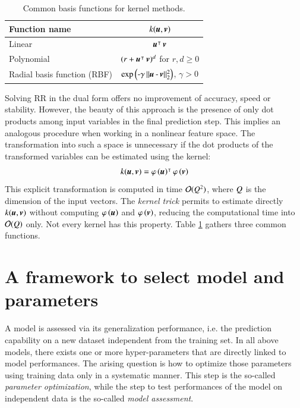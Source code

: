 \begin{table}
\centering
\begin{tabular}{lc} \toprule
	Function name  & $ k (\operatorname{\boldsymbol{u}}, \operatorname{\boldsymbol{v}}) $ \\ \midrule
	Linear  & $ \operatorname{\boldsymbol{u}}^{\intercal} \operatorname{\boldsymbol{v}} $ \\ \midrule
	Polynomial  & $ (r + \operatorname{\boldsymbol{u}}^{\intercal} \operatorname{\boldsymbol{v}})^d $ for $ r,d \geq 0 $\\ \midrule
	Radial basis function (RBF)  & $ \operatorname{\exp{ \left(-\gamma \ensuremath{\operatorname{\Arrowvert \mathit{\operatorname{\boldsymbol{u}} - \operatorname{\boldsymbol{v}}} \Arrowvert^2_2 }}\right)}}$, $ \gamma > 0 $ \\
	\bottomrule
\end{tabular}
\caption{Common basis functions for kernel methods.}
\label{tab_basisfunctions}
\end{table}

Solving RR in the dual form offers no improvement of accuracy, speed or stability. However, the beauty of this approach is the presence of only dot products among input variables in the final prediction step. This implies an analogous procedure when working in a nonlinear feature space. The transformation into such a space is unnecessary if the dot products of the transformed variables can be estimated using the kernel: 
\begin{equation}
k (\operatorname{\boldsymbol{u}}, \operatorname{\boldsymbol{v}}) = \operatorname{ \varphi \left(\mathit{\operatorname{\boldsymbol{u}}}\right)}^{\intercal} \operatorname{ \varphi \left(\mathit{\operatorname{\boldsymbol{v}}}\right)}
\end{equation}
This explicit transformation is computed in time $ \mathcal{O}(Q^2) $, where $ Q $ is the dimension of the input vectors. The \textit{kernel trick} permits to estimate directly $ k (\operatorname{\boldsymbol{u}}, \operatorname{\boldsymbol{v}}) $ without computing $ \operatorname{ \varphi \left(\mathit{\operatorname{\boldsymbol{u}}}\right)} $ and $ \operatorname{ \varphi \left(\mathit{\operatorname{\boldsymbol{v}}}\right)} $, reducing the computational time into $ \mathcal{O}(Q) $ only. Not every kernel has this property. Table \ref{tab_basisfunctions} gathers three common functions.

\section{A framework to select model and parameters}
A model is assessed via its generalization performance, i.e. the prediction capability on a new dataset independent from the training set. In all above models, there exists one or more hyper-parameters that are directly linked to model performances. The arising question is how to optimize those parameters using training data only in a systematic manner. This step is the so-called \textit{parameter optimization}, while the step to test performances of the model on independent data is the so-called \textit{model assessment}. 

